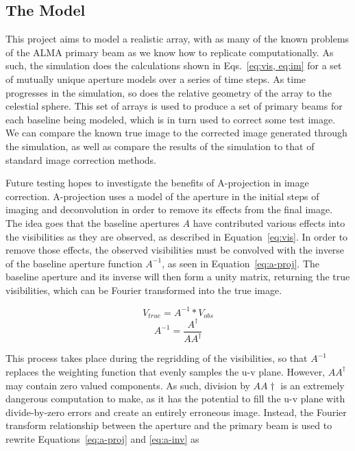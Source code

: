 \documentclass[11pt]{article}
\begin{document}
\subsection{The Model}

This project aims to model a realistic array, with as many of the known 
problems of the ALMA primary beam as we know how to replicate computationally.  
As such, the simulation does the calculations shown in Eqs.~\ref{eq:vis, eq:im} 
for a set of mutually unique aperture models over a series of time steps. As 
time progresses in the simulation, so does the relative geometry of the array 
to the celestial sphere.
This set of arrays is used to produce a set of primary beams for each baseline 
being modeled, which is in turn used to correct some test image. We can compare 
the known true image to the corrected image generated through the simulation, 
as well as compare the results of the simulation to that of standard image 
correction methods.



Future testing hopes to investigate the benefits of A-projection in image 
correction.
A-projection uses a model of the aperture in the initial steps of imaging and 
deconvolution in order to remove its effects from the final image. The idea 
goes that the baseline apertures $A$ have contributed various effects into the 
visibilities as they are observed, as described in Equation~\ref{eq:vis}. In 
order to remove those effects, the observed visibilities must be convolved with 
the inverse of the baseline aperture function $A^{-1}$, as seen in 
Equation~\ref{eq:a-proj}. The baseline aperture and its inverse will then form 
a unity matrix, returning the true visibilities, which can be Fourier 
transformed into the true image.

\begin{equation}
    \label{eq:a-proj}
    V_{true} = A^{-1} * V_{obs}
\end{equation}
\begin{equation}
    \label{eq:a-inv}
    A^{-1} = \frac{A^{\dagger}}{AA^{\dagger}}
\end{equation}

This process takes place during the regridding of the visibilities, so that 
$A^{-1}$ replaces the weighting function that evenly samples the u-v plane.  
However, $AA^{\dagger}$ may contain zero valued components. As such, division 
by $AA{\dagger}$ is an extremely dangerous computation to make, as it has the 
potential to fill the u-v plane with divide-by-zero errors and create an 
entirely erroneous image. Instead, the Fourier transform relationship between 
the aperture and the primary beam is used to rewrite Equations~\ref{eq:a-proj} 
and \ref{eq:a-inv} as
\end{document}

